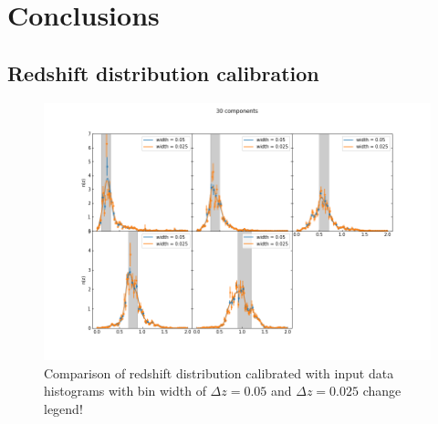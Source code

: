 \documentclass{aa}
\begin{document}
\section{Conclusions}
\label{sec:discussion}
  
\begin{acknowledgements}
  
\end{acknowledgements}






\begin{appendix} 
\section{Redshift distribution calibration}
\label{ap:calibration}
\begin{figure}
\label{fig:120vs240}
\centering
\includegraphics[scale=0.3]{plots/30.png}
\caption{Comparison of redshift distribution calibrated with input data histograms with bin width of $\Delta z = 0.05$ and $\Delta z = 0.025$ {\color{red} change legend!}}
\label{fig:comb_histogram_comparison}
\end{figure}
\begin{table}

\end{table}
\end{appendix}
\end{document}
